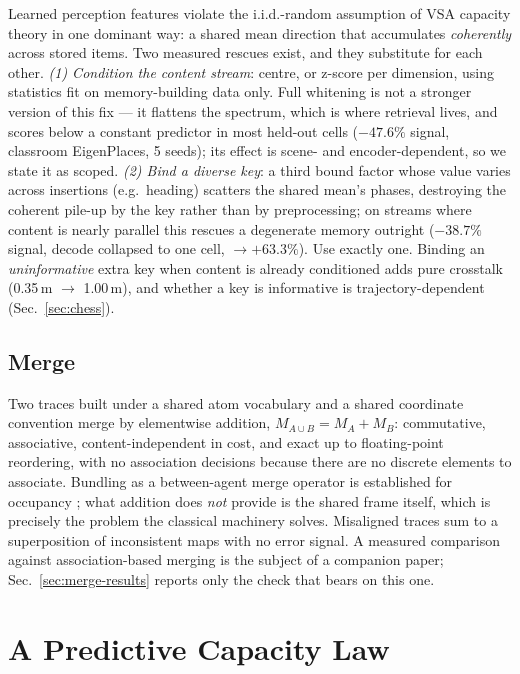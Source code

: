 \documentclass[conference]{IEEEtran}
\begin{document}
Learned perception features violate the i.i.d.-random assumption of VSA
capacity theory in one dominant way: a shared mean direction that
accumulates \emph{coherently} across stored items. Two measured rescues
exist, and they substitute for each other. \emph{(1) Condition the
content stream}: centre, or z-score per dimension, using statistics fit
on memory-building data only. Full whitening is not a stronger version of
this fix --- it flattens the spectrum, which is where retrieval lives,
and scores below a constant predictor in most held-out cells ($-47.6\%$
signal, classroom EigenPlaces, 5 seeds); its effect is scene- and
encoder-dependent, so we state it as scoped. \emph{(2) Bind a diverse
key}: a third bound factor whose value varies across insertions (e.g.\
heading) scatters the shared mean's phases, destroying the coherent
pile-up by the key rather than by preprocessing; on streams where content
is nearly parallel this rescues a degenerate memory outright ($-38.7\%$
signal, decode collapsed to one cell, $\to +63.3\%$).
Use exactly one. Binding an \emph{uninformative} extra key when content
is already conditioned adds pure crosstalk (0.35\,m $\to$ 1.00\,m), and
whether a key is informative is trajectory-dependent
(Sec.~\ref{sec:chess}).

\subsection{Merge}
\label{sec:merge-method}

Two traces built under a shared atom vocabulary and a shared coordinate
convention merge by elementwise addition, $M_{A\cup B} = M_A + M_B$:
commutative, associative, content-independent in cost, and exact up to
floating-point reordering, with no association decisions because there
are no discrete elements to associate. Bundling as a between-agent merge
operator is established for occupancy \cite{snyder2026vsaogm}; what
addition does \emph{not} provide is the shared frame itself, which is
precisely the problem the classical machinery solves. Misaligned traces
sum to a superposition of inconsistent maps with no error signal. A
measured comparison against association-based merging is the subject of a
companion paper; Sec.~\ref{sec:merge-results} reports only the check that
bears on this one.

\section{A Predictive Capacity Law}
\label{sec:law}
\end{document}
